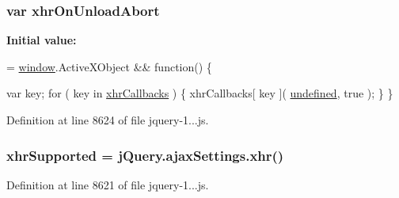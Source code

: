 \subsubsection[{\texorpdfstring{xhr\+On\+Unload\+Abort}{xhrOnUnloadAbort}}]{\setlength{\rightskip}{0pt plus 5cm}var xhr\+On\+Unload\+Abort}\hypertarget{obj_2_release_2_package_2_package_tmp_2_scripts_2jquery-1_810_82_8js_a271c099ab18ab35c15cac2faa2a097aa}{}\label{obj_2_release_2_package_2_package_tmp_2_scripts_2jquery-1_810_82_8js_a271c099ab18ab35c15cac2faa2a097aa}
{\bfseries Initial value\+:}
\begin{DoxyCode}
= \hyperlink{obj_2_release_2_package_2_package_tmp_2_scripts_2jquery-1_810_82_8js_a04a8a2bbfa9c15500892b8e5033d625b}{window}.ActiveXObject && \textcolor{keyword}{function}() \{
        
        var key;
        \textcolor{keywordflow}{for} ( key in \hyperlink{obj_2_release_2_package_2_package_tmp_2_scripts_2jquery-1_810_82_8js_a068f27a70831ff3a9e0ffa79e063847f}{xhrCallbacks} ) \{
            xhrCallbacks[ key ]( \hyperlink{obj_2_release_2_package_2_package_tmp_2_scripts_2jquery-1_810_82_8js_a08113a236cc18d2a9d5ce27e638012be}{undefined}, true );
        \}
    \}
\end{DoxyCode}


Definition at line 8624 of file jquery-\/1...\+js.

\subsubsection[{\texorpdfstring{xhr\+Supported}{xhrSupported}}]{\setlength{\rightskip}{0pt plus 5cm}xhr\+Supported = {\bf j\+Query.\+ajax\+Settings.\+xhr}()}\hypertarget{obj_2_release_2_package_2_package_tmp_2_scripts_2jquery-1_810_82_8js_afd7e72f2f357a5a8b17e46776a6283eb}{}\label{obj_2_release_2_package_2_package_tmp_2_scripts_2jquery-1_810_82_8js_afd7e72f2f357a5a8b17e46776a6283eb}


Definition at line 8621 of file jquery-\/1...\+js.

